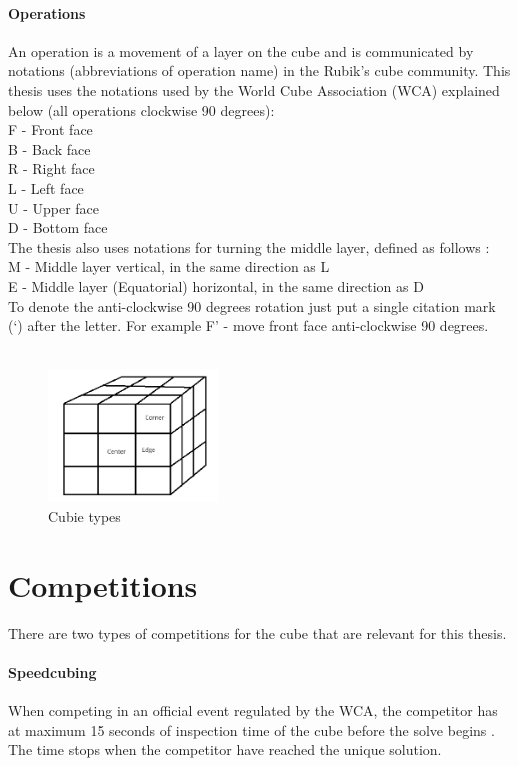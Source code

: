 \documentclass[a4paper,11pt]{kth-mag}
\begin{document}
\paragraph{Operations}

An operation is a movement of a layer on the cube and is communicated by notations (abbreviations of operation name) in the Rubik's cube community. This thesis uses the notations used by the World Cube Association (WCA) \cite{WCA1} explained below (all operations clockwise 90 degrees):\\
F - Front face\\
B - Back face\\
R - Right face\\
L - Left face\\
U - Upper face\\
D - Bottom face\\
The thesis also uses notations for turning the middle layer, defined as follows \cite{Ruwix}:\\
M - Middle layer vertical, in the same direction as L\\
E - Middle layer (Equatorial) horizontal, in the same direction as D\\
To denote the anti-clockwise 90 degrees rotation just put a single citation mark (‘) after the letter. For example F’ - move front face anti-clockwise 90 degrees.\\\\


\begin{figure}[t]
	\centering
	\includegraphics[width= 0.4\textwidth]{figs/representation.png}
	\caption{Cubie types}
	\label{fig_3}
\end{figure}
\section{Competitions}
There are two types of competitions for the cube that are relevant for this thesis.
\paragraph{Speedcubing}
When competing in an official event regulated by the WCA, the competitor has at maximum 15 seconds of inspection time of the cube before the solve begins \cite{WCA2}. The time stops when the competitor have reached the unique solution. 
\end{document}
